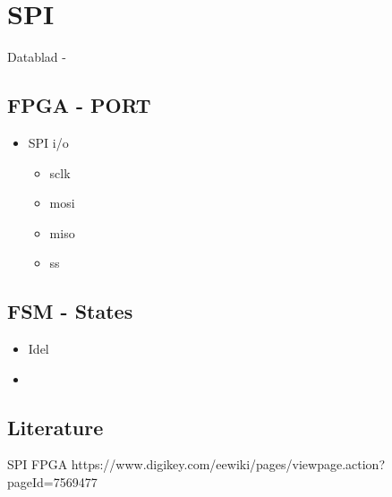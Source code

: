\documentclass[../main]{subfiles}
\begin{document}
\section{SPI}
\label{sec:indledning}

Datablad -
\cite{xilinx2019fpga}
\subsection{FPGA - PORT}
\begin{itemize}
  \item SPI i/o
  \begin{itemize}
    \item sclk
    \item mosi
    \item miso
    \item ss
  \end{itemize}

\end{itemize}

\subsection{FSM - States}
\begin{itemize}
  \item Idel
  \item
\end{itemize}

\subsection{Literature}
SPI FPGA https://www.digikey.com/eewiki/pages/viewpage.action?pageId=7569477
\end{document}
